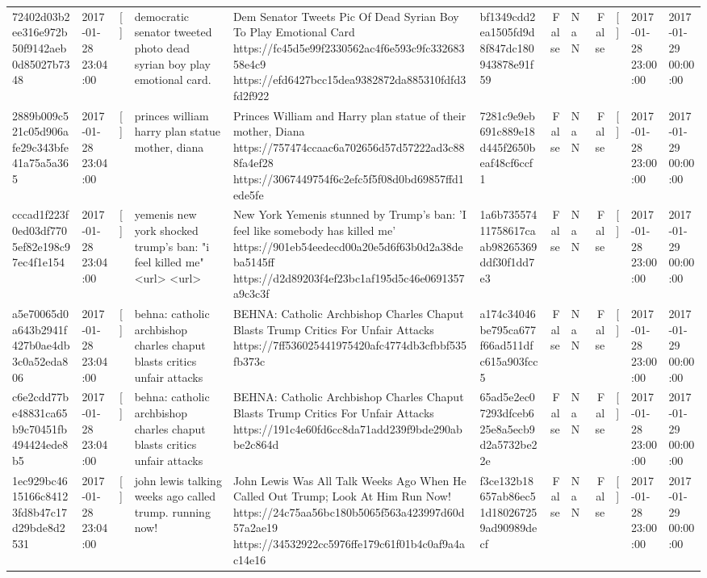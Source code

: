 \begin{tabular}{llllllrlrlll}
72402d03b2ee316e972b50f9142aeb0d85027b7348 & 2017-01-28 23:04:00 & [] & democratic senator tweeted photo dead syrian boy play emotional card. & Dem Senator Tweets Pic Of Dead Syrian Boy To Play Emotional Card https://fc45d5e99f2330562ac4f6e593c9fc33268358e4c9 https://efd6427bcc15dea9382872da885310fdfd3fd2f922 & bf1349cdd2ea1505fd9d8f847dc180943878e91f59 & False & NaN & False & [] & 2017-01-28 23:00:00 & 2017-01-29 00:00:00 \\
2889b009c521c05d906afe29c343bfe41a75a5a365 & 2017-01-28 23:04:00 & [] & princes william harry plan statue mother, diana & Princes William and Harry plan statue of their mother, Diana https://757474ccaac6a702656d57d57222ad3c888fa4ef28 https://3067449754f6c2efc5f5f08d0bd69857ffd1ede5fe & 7281c9e9eb691c889e18d445f2650beaf48cf6ccf1 & False & NaN & False & [] & 2017-01-28 23:00:00 & 2017-01-29 00:00:00 \\
cccad1f223f0ed03df7705ef82e198c97ec4f1e154 & 2017-01-28 23:04:00 & [] & yemenis new york shocked trump's ban: "i feel killed me" <url> <url> & New York Yemenis stunned by Trump's ban: 'I feel like somebody has killed me' https://901eb54eedecd00a20e5d6f63b0d2a38deba5145ff https://d2d89203f4ef23bc1af195d5c46e0691357a9c3c3f & 1a6b73557411758617caab98265369ddf30f1dd7e3 & False & NaN & False & [] & 2017-01-28 23:00:00 & 2017-01-29 00:00:00 \\
a5e70065d0a643b2941f427b0ae4db3c0a52eda806 & 2017-01-28 23:04:00 & [] & behna: catholic archbishop charles chaput blasts critics unfair attacks & BEHNA: Catholic Archbishop Charles Chaput Blasts Trump Critics For Unfair Attacks https://7ff536025441975420afc4774db3cfbbf535fb373c & a174c34046be795ca677f66ad511dfc615a903fcc5 & False & NaN & False & [] & 2017-01-28 23:00:00 & 2017-01-29 00:00:00 \\
c6e2cdd77be48831ca65b9c70451fb494424ede8b5 & 2017-01-28 23:04:00 & [] & behna: catholic archbishop charles chaput blasts critics unfair attacks & BEHNA: Catholic Archbishop Charles Chaput Blasts Trump Critics For Unfair Attacks https://191c4e60fd6cc8da71add239f9bde290abbe2c864d & 65ad5e2ec07293dfceb625e8a5ecb9d2a5732be22e & False & NaN & False & [] & 2017-01-28 23:00:00 & 2017-01-29 00:00:00 \\
1ec929bc4615166c84123fd8b47c17d29bde8d2531 & 2017-01-28 23:04:00 & [] & john lewis talking weeks ago called trump. running now! & John Lewis Was All Talk Weeks Ago When He Called Out Trump; Look At Him Run Now! https://24c75aa56bc180b5065f563a423997d60d57a2ae19 https://34532922cc5976ffe179c61f01b4c0af9a4ac14e16 & f3ce132b18657ab86ec51d180267259ad90989decf & False & NaN & False & [] & 2017-01-28 23:00:00 & 2017-01-29 00:00:00 \\

\end{tabular}
